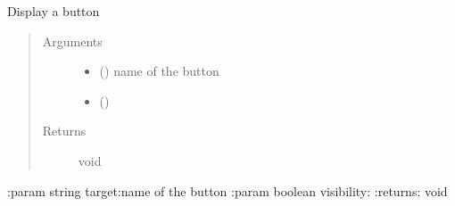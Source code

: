 \documentclass[a4paper,12pt,english]{sphinxmanual}
\begin{document}
\begin{fulllineitems}
\label{\detokenize{viewer/parameters:BIMDataViewer.showButtonMenu}}
Display a button
\begin{quote}\begin{description}
\item[{Arguments}] \leavevmode\begin{itemize}
\item {} 
 () \textendash{} name of the button

\item {} 
 () \textendash{} 

\end{itemize}

\item[{Returns}] \leavevmode
void

\end{description}\end{quote}

\end{fulllineitems}



\begin{fulllineitems}
\label{\detokenize{viewer/parameters:BIMDataViewer.showSelectModeMenu}}
:param string target:name of the button
:param boolean visibility:
:returns: void

\end{fulllineitems}
\end{document}
